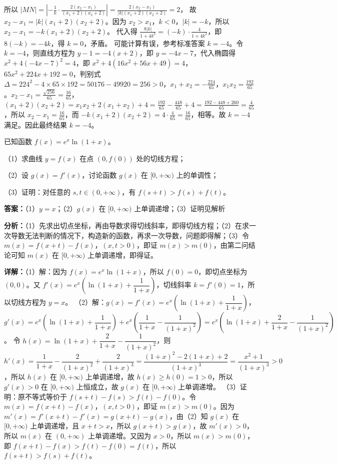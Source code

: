 \begin{question}[points=15]
\begin{solution}
所以 $|MN| = \left|-\frac{1}{k}\cdot\frac{2(x_2-x_1)}{(x_1+2)(x_2+2)}\right| = \frac{2(x_2-x_1)}{|k|(x_1+2)(x_2+2)} = 2$，
故 $x_2-x_1 = |k|(x_1+2)(x_2+2)$。因为 $x_2>x_1$，$k<0$，$|k|=-k$，所以 $x_2-x_1 = -k(x_1+2)(x_2+2)$。
代入得 $\frac{8|k|}{1+4k^2} = (-k)\cdot\frac{4}{1+4k^2}$，即 $8(-k) = -4k$，得 $k=0$，矛盾。
可能计算有误，参考标准答案 $k=-4$。令 $k=-4$，则直线方程为 $y-1 = -4(x+2)$，即 $y = -4x-7$，代入椭圆得 $x^2+4(-4x-7)^2=4$，即 $x^2+4(16x^2+56x+49)=4$，$65x^2+224x+192=0$，判别式 $\Delta = 224^2-4\times65\times192 = 50176-49920=256>0$，$x_1+x_2 = -\frac{224}{65}$，$x_1x_2 = \frac{192}{65}$。$x_2-x_1 = \frac{\sqrt{256}}{65} = \frac{16}{65}$，$(x_1+2)(x_2+2)=x_1x_2+2(x_1+x_2)+4 = \frac{192}{65} -\frac{448}{65}+4 = \frac{192-448+260}{65} = \frac{4}{65}$，所以 $x_2-x_1 = \frac{16}{65}$，而 $-k(x_1+2)(x_2+2)=4\cdot\frac{4}{65}=\frac{16}{65}$，相等。故 $k=-4$ 满足。因此最终结果 $k=-4$。
\end{solution}
\end{question}

\begin{question}[points=15]
已知函数 $f(x) = e^x \ln(1+x)$。

（1）求曲线 $y=f(x)$ 在点 $(0,f(0))$ 处的切线方程；

（2）设 $g(x)=f'(x)$，讨论函数 $g(x)$ 在 $[0,+\infty)$ 上的单调性；

（3）证明：对任意的 $s,t\in (0,+\infty)$，有 $f(s+t) > f(s)+f(t)$。
\begin{solution}
\textbf{答案：}（1）$y=x$；（2）$g(x)$ 在 $[0,+\infty)$ 上单调递增；（3）证明见解析

\textbf{分析：}（1）先求出切点坐标，再由导数求得切线斜率，即得切线方程；（2）在求一次导数无法判断的情况下，构造新的函数，再求一次导数，问题即得解；（3）令 $m(x)=f(x+t)-f(x)$，$(x,t>0)$，即证 $m(x)>m(0)$，由第二问结论可知 $m(x)$ 在 $[0,+\infty)$ 上单调递增，即得证。

\textbf{详解：}（1）解：因为 $f(x)=e^x\ln(1+x)$，所以 $f(0)=0$，即切点坐标为 $(0,0)$。又 $f'(x)=e^x\left(\ln(1+x)+\dfrac{1}{1+x}\right)$，切线斜率 $k=f'(0)=1$，所以切线方程为 $y=x$。
（2）解：$g(x)=f'(x)=e^x\left(\ln(1+x)+\dfrac{1}{1+x}\right)$，$g'(x)=e^x\left(\ln(1+x)+\dfrac{1}{1+x}\right)+e^x\left(\dfrac{1}{1+x}-\dfrac{1}{(1+x)^2}\right)=e^x\left(\ln(1+x)+\dfrac{2}{1+x}-\dfrac{1}{(1+x)^2}\right)$。
令 $h(x)=\ln(1+x)+\dfrac{2}{1+x}-\dfrac{1}{(1+x)^2}$，则 $h'(x)=\dfrac{1}{1+x}-\dfrac{2}{(1+x)^2}+\dfrac{2}{(1+x)^3}=\dfrac{(1+x)^2-2(1+x)+2}{(1+x)^3}=\dfrac{x^2+1}{(1+x)^3}>0$，所以 $h(x)$ 在 $[0,+\infty)$ 上单调递增，故 $h(x)\ge h(0)=1>0$，所以 $g'(x)>0$ 在 $[0,+\infty)$ 上恒成立，故 $g(x)$ 在 $[0,+\infty)$ 上单调递增。
（3）证明：原不等式等价于 $f(s+t)-f(s)>f(t)-f(0)$。令 $m(x)=f(x+t)-f(x)$，$(x,t>0)$，即证 $m(x)>m(0)$。因为 $m'(x)=f'(x+t)-f'(x)=g(x+t)-g(x)$，由（2）知 $g(x)$ 在 $[0,+\infty)$ 上单调递增，且 $x+t>x$，所以 $g(x+t)>g(x)$，故 $m'(x)>0$，所以 $m(x)$ 在 $(0,+\infty)$ 上单调递增。又因为 $x>0$，所以 $m(x)>m(0)$，即 $f(x+t)-f(x)>f(t)-f(0)=f(t)$，所以 $f(s+t)>f(s)+f(t)$。
\end{solution}
\end{question}

